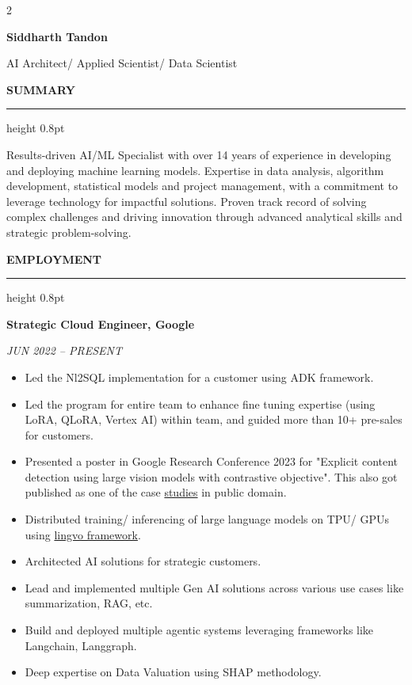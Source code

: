 \documentclass[10pt, a4paper]{article}
\newcommand{\cvsection}[1]{%
  \vspace{1.2\baselineskip}%
  {\large\bfseries\sffamily\MakeUppercase{#1}}\par\vspace{0.4ex}%
  {\color{black!70}\hrule height 0.8pt}\par
  \vspace{0.8\baselineskip}%
}
\begin{document}

\begin{paracol}{2}


{\fontsize{24pt}{26pt}\selectfont\bfseries Siddharth Tandon}\par
\vspace{0.5ex}
{\fontsize{12pt}{14pt}\selectfont AI Architect/ Applied Scientist/  Data Scientist}\par

\cvsection{Summary}
Results-driven AI/ML Specialist with over 14 years of experience in developing and deploying machine learning models. Expertise in data analysis, algorithm development, statistical models and project management, with a commitment to leverage technology for impactful solutions. Proven track record of solving complex challenges and driving innovation through advanced analytical skills and strategic problem-solving. 

\cvsection{Employment}
{\bfseries Strategic Cloud Engineer, Google}\par
\vspace{0.5ex} %
{\color{dategray}\itshape\MakeUppercase{Jun 2022 – Present}}
\vspace{1.0ex} %
\begin{itemize}
    \item Led the Nl2SQL implementation for a customer using ADK framework.
    \item Led the program for entire team to enhance fine tuning expertise (using LoRA, QLoRA, Vertex AI) within team, and guided more than 10+ pre-sales for customers.
    \item Presented a poster in Google Research Conference 2023 for "Explicit content detection using large vision models with contrastive objective". This also got published as one of the case \href{https://cloud.google.com/customers/nexon/?hl=ko}{studies} in public domain.
    \item Distributed training/ inferencing of large language models on TPU/ GPUs using \href{https://github.com/tensorflow/lingvo}{lingvo framework}.
    \item Architected AI solutions for strategic customers.
    \item Lead and implemented multiple Gen AI solutions across various use cases like summarization, RAG, etc.
    \item Build and deployed multiple agentic systems leveraging frameworks like Langchain, Langgraph.
    \item Deep expertise on Data Valuation using SHAP methodology.
\end{itemize}
\vspace{1.2\baselineskip} %


\end{paracol}
\end{document}

